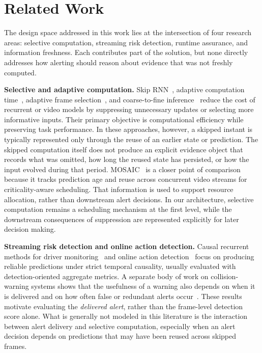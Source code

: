 \documentclass[conference]{IEEEtran}
\begin{document}
\section{Related Work}
\label{sec:related}

The design space addressed in this work lies at the intersection of four
research areas: selective computation, streaming risk detection, runtime
assurance, and information freshness. Each contributes part of the
solution, but none directly addresses how alerting should reason about
evidence that was not freshly computed.

\textbf{Selective and adaptive computation.} Skip
RNN~\cite{campos2018skiprnn}, adaptive computation
time~\cite{graves2016act}, adaptive frame
selection~\cite{wu2019adaframe}, and coarse-to-fine
inference~\cite{wu2019liteeval} reduce the cost of recurrent or video
models by suppressing unnecessary updates or selecting more informative
inputs. Their primary objective is computational efficiency while
preserving task performance. In these approaches, however, a skipped
instant is typically represented only through the reuse of an earlier
state or prediction. The skipped computation itself does not produce an
explicit evidence object that records what was omitted, how long the
reused state has persisted, or how the input evolved during that period.
MOSAIC~\cite{gokarn2023mosaic} is a closer point of comparison because it
tracks prediction age and reuse across concurrent video streams for
criticality-aware scheduling. That information is used to support
resource allocation, rather than downstream alert decisions. In our
architecture, selective computation remains a scheduling mechanism at
the first level, while the downstream consequences of suppression are
represented explicitly for later decision making.

\textbf{Streaming risk detection and online action detection.} Causal
recurrent methods for driver monitoring~\cite{sajid2021,fresta2025} and
online action detection~\cite{xu2021oad} focus on producing reliable
predictions under strict temporal causality, usually evaluated with
detection-oriented aggregate metrics. A separate body of work on
collision-warning systems shows that the usefulness of a warning also
depends on when it is delivered and on how often false or redundant
alerts occur~\cite{abe2006timing,bliss2003alarm}. These results motivate
evaluating the \emph{delivered alert}, rather than the frame-level
detection score alone. What is generally not modeled in this literature
is the interaction between alert delivery and selective computation,
especially when an alert decision depends on predictions that may have
been reused across skipped frames.
\end{document}
